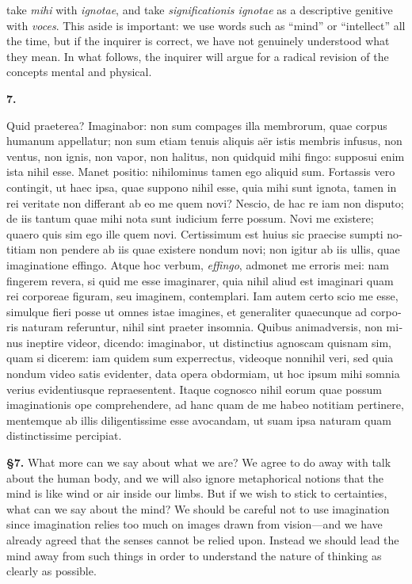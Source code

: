 take \textit{mihi} with \textit{ignotae}, and take \textit{significationis ignotae} as a descriptive genitive with \textit{voces}. This aside is important: we use words such as ``mind'' or ``intellect'' all the time, but if the inquirer is correct, we have not genuinely understood what they mean. In what follows, the inquirer will argue for a radical revision of the concepts mental and physical.

\clearpage

\beginnumbering
\pstart
    \textbf{7.} \begin{latin}Quid praeterea? Imaginabor: non sum compages illa membrorum, quae corpus humanum appellatur; non sum etiam tenuis aliquis aër istis membris infusus, non ventus, non ignis, non vapor, non halitus, non quidquid mihi fingo: supposui enim ista nihil esse. Manet positio: nihilominus tamen ego aliquid sum. Fortassis vero contingit, ut haec ipsa, quae suppono nihil esse, quia mihi sunt ignota, tamen in rei veritate non differant ab eo me quem novi? Nescio, de hac re iam non disputo; de iis tantum quae mihi nota sunt iudicium ferre possum. Novi me existere; quaero quis sim ego ille quem novi. Certissimum est huius sic praecise sumpti notitiam non pendere ab iis quae existere nondum novi; non igitur ab iis ullis, quae imaginatione effingo. Atque hoc verbum, \textit{effingo}, admonet me erroris mei: nam fingerem revera, si quid me esse imaginarer, quia nihil aliud est imaginari quam rei corporeae figuram, seu imaginem, contemplari. Iam autem certo scio me esse, simulque fieri posse ut omnes istae imagines, et generaliter quaecunque ad corporis naturam referuntur, nihil sint praeter insomnia. Quibus animadversis, non minus ineptire videor, dicendo: imaginabor, ut distinctius agnoscam quisnam sim, quam si dicerem: iam quidem sum experrectus, videoque nonnihil veri, sed quia nondum video satis evidenter, data opera obdormiam, ut hoc ipsum mihi somnia verius evidentiusque repraesentent. Itaque cognosco nihil eorum quae possum imaginationis ope comprehendere, ad hanc quam de me habeo notitiam pertinere, mentemque ab illis diligentissime esse avocandam, ut suam ipsa naturam quam distinctissime percipiat.\end{latin}
\pend
\endnumbering

\prenotes

\textbf{§7.} What more can we say about what we are? We agree to do away with talk about the human body, and we will also ignore metaphorical notions that the mind is like wind or air inside our limbs. But if we wish to stick to certainties, what can we say about the mind? We should be careful not to use imagination since imagination relies too much on images drawn from vision---and we have already agreed that the senses cannot be relied upon. Instead we should lead the mind away from such things in order to understand the nature of thinking as clearly as possible.

